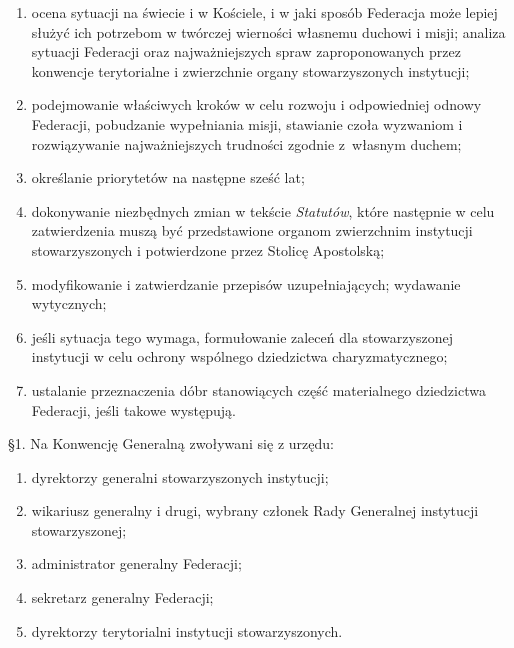 \begin{enumerate}


\item ocena sytuacji na świecie i w Kościele, i w jaki sposób Federacja może lepiej służyć ich potrzebom w twórczej wierności własnemu duchowi i misji; analiza sytuacji Federacji oraz najważniejszych spraw zaproponowanych przez konwencje terytorialne i zwierzchnie organy stowarzyszonych instytucji;


\item podejmowanie właściwych kroków w celu rozwoju i odpowiedniej odnowy Federacji, pobudzanie wypełniania misji, stawianie czoła wyzwaniom i rozwiązywanie najważniejszych trudności zgodnie \mbox{z własnym} duchem;


\item określanie priorytetów na następne sześć lat;


\item dokonywanie niezbędnych zmian w tekście {\em Statutów}, które następnie w celu zatwierdzenia muszą być przedstawione organom zwierzchnim instytucji stowarzyszonych i potwierdzone przez Stolicę Apostolską;


\item modyfikowanie i zatwierdzanie przepisów uzupełniających; wydawanie wytycznych;


\item jeśli sytuacja tego wymaga, formułowanie zaleceń dla stowarzyszonej instytucji  w celu ochrony wspólnego dziedzictwa charyzmatycznego;


\item ustalanie przeznaczenia dóbr stanowiących część materialnego dziedzictwa Federacji, jeśli takowe występują.  


\end{enumerate}




 \S{}1. Na Konwencję Generalną zwoływani się z urzędu:


\begin{enumerate}


\item dyrektorzy generalni stowarzyszonych instytucji;


\item wikariusz generalny i drugi, wybrany członek Rady Generalnej instytucji stowarzyszonej;


\item administrator generalny Federacji;


\item sekretarz generalny Federacji;


\item dyrektorzy terytorialni instytucji stowarzyszonych.


\end{enumerate}


